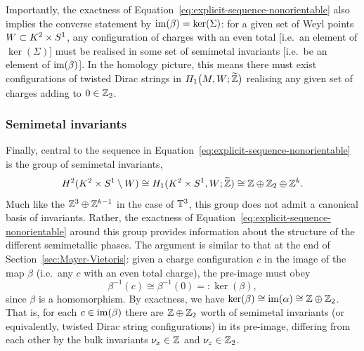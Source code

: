 Importantly, the exactness of Equation~\eqref{eq:explicit-sequence-nonorientable} also implies the converse statement by $\operatorname{im}(\beta) = \ker(\Sigma)$: %
for a given set of Weyl points $W\subset K^2\times S^1$, any configuration of charges with an even total [i.e.\ an element of $\ker(\Sigma)$] must be realised in some set of semimetal invariants [i.e.\ be an element of $\operatorname{im}(\beta)$]. In the homology picture, this means there must exist configurations of twisted Dirac strings in $H_1\big(M, W;\widetilde{\mathbb{Z}}\big)$ realising any given set of charges adding to $0\in\mathbb{Z}_2$.

\subsubsection{Semimetal invariants}

Finally, central to the sequence in Equation~\eqref{eq:explicit-sequence-nonorientable} is the group of semimetal invariants,
\begin{equation}\label{eq:semimetal-group-nonor}
	H^2(K^2\times S^1\setminus W)\cong H_1(K^2\times S^1, W; \widetilde{\mathbb{Z}})\cong \mathbb{Z}\oplus\mathbb{Z}_2\oplus\mathbb{Z}^k.
\end{equation}
Much like the $\mathbb{Z}^3\oplus\mathbb{Z}^{k-1}$ in the case of $\mathbb{T}^3$, this group does not admit a canonical basis of invariants. Rather, the exactness of Equation~\eqref{eq:explicit-sequence-nonorientable} around this group provides information about the structure of the different semimetallic phases. The argument is similar to that at the end of Section~\ref{sec:Mayer-Vietoris}: given a charge configuration $c$ in the image of the map $\beta$ (i.e.\ any $c$ with an even total charge), the pre-image must obey
\begin{equation*}
	\beta^{-1}(c) \cong \beta^{-1}(0) =: \ker(\beta),
\end{equation*}
since $\beta$ is a homomorphism. By exactness, we have $\ker(\beta)\cong\operatorname{im}(\alpha)\cong\mathbb{Z}\oplus\mathbb{Z}_2$. %
That is, for each $c\in\operatorname{im}(\beta)$ there are $\mathbb{Z}\oplus\mathbb{Z}_2$ worth of %
semimetal invariants (or equivalently, twisted Dirac string configurations) in its pre-image, differing from each other by the bulk invariants $\nu_x\in\mathbb{Z}$ and $\nu_z\in\mathbb{Z}_2$.

